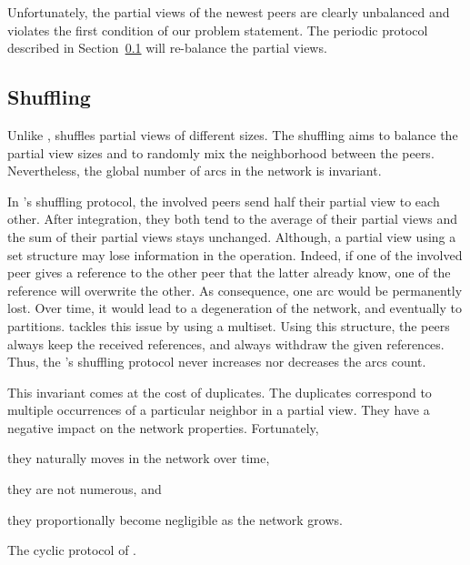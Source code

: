 Unfortunately, the partial views of the newest peers are clearly unbalanced and
violates the first condition of our problem statement. The periodic protocol
described in Section~\ref{subsec:cyclic} will re-balance the partial views.

\subsection{Shuffling}
\label{subsec:cyclic}

Unlike \CYCLON, \SPRAY shuffles partial views of different sizes. The shuffling
aims to balance the partial view sizes and to randomly mix the neighborhood
between the peers. Nevertheless, the global number of arcs in the network is
invariant.

In \SPRAY's shuffling protocol, the involved peers send half their partial view
to each other. After integration, they both tend to the average of their
partial views and the sum of their partial views stays unchanged. Although, a
partial view using a set structure may lose information in the
operation. Indeed, if one of the involved peer gives a reference to the other
peer that the latter already know, one of the reference will overwrite the
other. As consequence, one arc would be permanently lost. Over time, it would
lead to a degeneration of the network, and eventually to partitions. \SPRAY
tackles this issue by using a multiset. Using this structure, the peers always
keep the received references, and always withdraw the given references. Thus,
the \SPRAY's shuffling protocol never increases nor decreases the arcs count.

This invariant comes at the cost of duplicates. The duplicates correspond to
multiple occurrences of a particular neighbor in a partial view. They have a
negative impact on the network properties. Fortunately,
\begin{inparaenum}[(i)]
\item they naturally moves in the network over time,
\item they are not numerous, and
\item they proportionally become negligible as the network grows.
\end{inparaenum}

\begin{algorithm}[h]
  
  \caption{\label{algo:scamplon}The cyclic protocol of \SPRAY.}
\end{algorithm}

